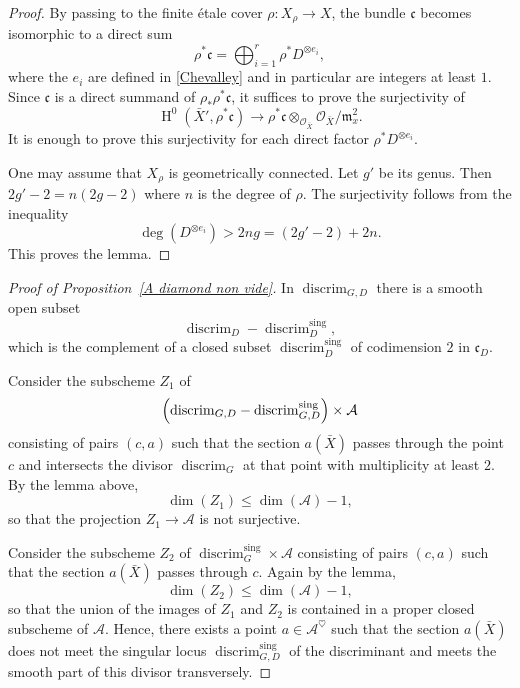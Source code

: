 \documentclass[12pt,english]{smfart}
\numberwithin{equation}{subsection}
\theoremstyle{remark}
\begin{document}
\begin{proof}
By passing to the finite \'etale cover $\rho: X_\rho\rightarrow X$, the bundle $\mathfrak{c}$ becomes isomorphic
to a direct sum
$$
\rho^* \mathfrak{c} =\bigoplus_{i=1}^r \rho^* D^{\otimes e_i},
$$
where the $e_i$ are defined in \ref{Chevalley} and in particular are integers at least $1$.
Since $\mathfrak{c}$ is a direct summand of $\rho_* \rho^* \mathfrak{c}$, it suffices to prove the surjectivity of
$$
\operatorname{H}^0(\bar{X}',\rho^*\mathfrak{c})\longrightarrow \rho^*\mathfrak{c}\otimes_{\mathcal{O}_{\bar{X}}}\mathcal{O}_{\bar{X}}/\mathfrak{m}_x^2.
$$
It is enough to prove this surjectivity for each direct factor $\rho^*D^{\otimes e_i}$.

One may assume that $X_\rho$ is geometrically connected. Let $g'$ be its genus. Then $2g'-2=n(2g-2)$ where $n$ is the degree of $\rho$.
The surjectivity follows from the inequality
$$
\deg(D^{\otimes e_i})>2ng=(2g'-2)+2n.
$$
This proves the lemma.
\end{proof}

\begin{proof}[Proof of Proposition~\ref{A diamond non vide}]
In $\operatorname{discrim}_{G,D}$ there is a smooth open subset
$$
{\operatorname{discrim}_{D}}-\operatorname{discrim}_{D}^{\mathrm{sing}},
$$
which is the complement of a closed subset $\operatorname{discrim}_{D}^{\mathrm{sing}}$ of codimension $2$ in $\mathfrak{c}_D$.

Consider the subscheme $Z_1$ of
$$
\Bigl({\operatorname{discrim}_{G,D}}-\operatorname{discrim}_{G,D}^{\mathrm{sing}}\Bigr)\times \mathcal{A}
$$
consisting of pairs $(c,a)$ such that the section $a(\bar{X})$ passes through the point $c$
and intersects the divisor ${\operatorname{discrim}_{G}}$ at that point with multiplicity at least $2$.
By the lemma above,
$$
\dim(Z_1)\le \dim(\mathcal{A})-1,
$$
so that the projection $Z_1\rightarrow \mathcal{A}$ is not surjective.

Consider the subscheme $Z_2$ of $\operatorname{discrim}_{G}^{\mathrm{sing}}\times \mathcal{A}$ consisting of pairs $(c,a)$
such that the section $a(\bar{X})$ passes through $c$. Again by the lemma,
$$
\dim(Z_2)\le \dim(\mathcal{A})-1,
$$
so that the union of the images of $Z_1$ and $Z_2$ is contained in a proper closed subscheme of $\mathcal{A}$.
Hence, there exists a point $a\in\mathcal{A}^{\heartsuit}$ such that the section $a(\bar{X})$
does not meet the singular locus $\operatorname{discrim}_{G,D}^{\mathrm{sing}}$ of the discriminant and meets
the smooth part of this divisor transversely.
\end{proof}
\end{document}
